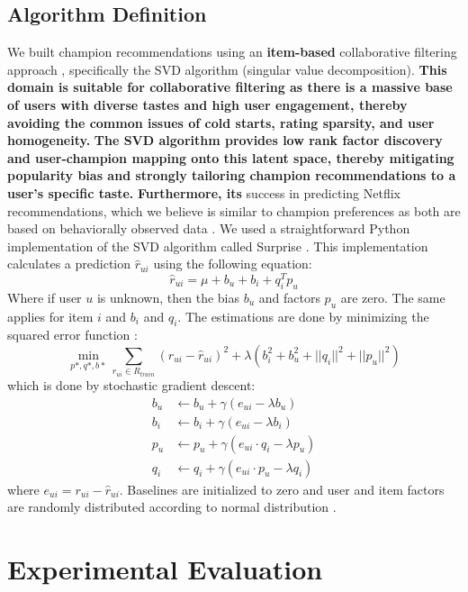 \documentclass [11pt]{IEEEtran}
\begin{document}
\subsection{Algorithm Definition}
We built champion recommendations using an 
\textbf{item-based}
collaborative filtering approach \cite{Sarwar:2001}, specifically the SVD algorithm (singular value decomposition). 
\textbf{This domain is suitable for collaborative filtering as there is a massive base of users with diverse tastes and high user engagement, thereby avoiding the common issues of cold starts, rating sparsity, and user homogeneity.} 
\textbf{The SVD algorithm provides low rank factor discovery and user-champion mapping onto this latent space, thereby mitigating popularity bias and strongly tailoring champion recommendations to a user's specific taste.}
\textbf{Furthermore, its}
success in predicting Netflix recommendations, which we believe is similar to champion preferences as both are based on behaviorally observed data \cite{paterek2007improving}. 
We used a straightforward Python implementation of the SVD algorithm called Surprise \cite{Surprise}. \midskip
This implementation calculates a prediction $\hat{r}_{ui}$ using the following equation:
$$
    \hat{r}_{ui} = \mu + b_u + b_i + q_i^Tp_u
$$
Where if user $u$ is unknown, then the bias $b_u$ and factors $p_u$ are zero. The same applies for item $i$ and $b_i$ and $q_i$. The estimations are done by minimizing the squared error function
\cite{koren2009matrix} :
$$
    \min_{p*,q*,b*} \sum_{r_{ui} \in R_{train}} \left(r_{ui} - \hat{r}_{ui} \right)^2 + 
\lambda\left(b_i^2 + b_u^2 + ||q_i||^2 + ||p_u||^2\right)
$$
which is done by stochastic gradient descent:
\begin{align*}
b_u &\leftarrow b_u + \gamma (e_{ui} - \lambda b_u)\\
b_i &\leftarrow b_i + \gamma (e_{ui} - \lambda b_i)\\
p_u &\leftarrow p_u + \gamma (e_{ui} \cdot q_i - \lambda p_u)\\
q_i &\leftarrow q_i + \gamma (e_{ui} \cdot p_u - \lambda q_i)
\end{align*}
where $e_{ui} = r_{ui} - \hat{r}_{ui}$. Baselines are initialized to zero and user and item factors are randomly distributed according to normal distribution \cite{Surprise}.
\section{Experimental Evaluation}
\end{document}
